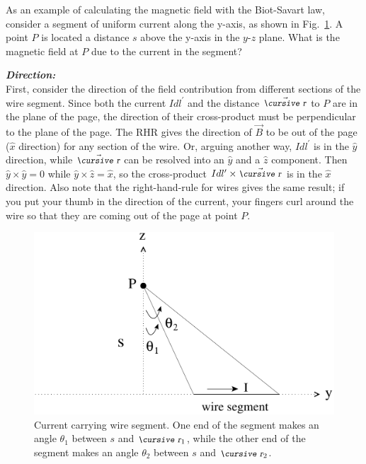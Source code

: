\documentclass[12pt]{article}
\begin{document}
\begin{flushleft}
As an example of calculating the magnetic field with the Biot-Savart law, consider a segment of uniform current along the y-axis, as shown in Fig.~\ref{fig:iseg}.  A point $P$ is located a distance $s$ above the y-axis in the $y$-$z$ plane.  What is the magnetic field at $P$ due to the current in the segment?  

\textbf{\textit{Direction:}}\\
\vspace{.1in}
First, consider the direction of the field contribution from different sections of the wire segment.  Since both the current $Idl^{\prime}$ and the distance $\vec{\text{\small\slshape\cursive r}}$ to $P$ are in the plane of the page, the direction of their cross-product must be perpendicular to the plane of the page.  The RHR gives the direction of $\vec{B}$ to be out of the page ($\hat{x}$ direction) for any section of the wire.  Or, arguing another way, $Idl^{\prime}$ is in the $\hat{y}$ direction, while $\vec{\text{\small\slshape\cursive r}}$ can be resolved into an $\hat{y}$ and a $\hat{z}$ component.  Then $\hat{y} \times \hat{y} =0$ while $\hat{y} \times \hat{z} = \hat{x}$, so the cross-product $Idl^{\prime} \times \vec{\text{\small\slshape\cursive r}}$ is in the $\hat{x}$ direction.  Also note that the right-hand-rule for wires gives the same result; if you put your thumb in the direction of the current, your fingers curl around the wire so that they are coming out of the page at point $P$.
\vspace{.2in}

\begin{figure}[h]
\centering
\includegraphics*[width=.6\columnwidth]{current_segment.pdf} 
\caption{Current carrying wire segment.  One end of the segment makes an angle $\theta_{1}$ between $s$ and $\text{\small\slshape\cursive r}_{1}$, while the other end of the segment makes an angle $\theta_{2}$ between $s$ and $\text{\small\slshape\cursive r}_{2}$.}
\label{fig:iseg}
\end{figure}


\end{flushleft}
\end{document}
